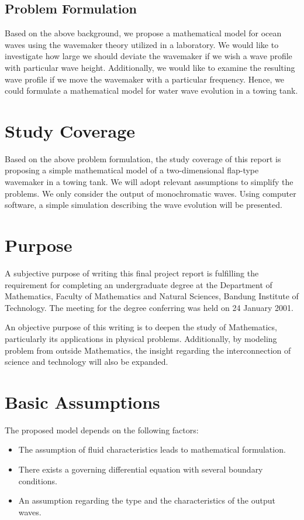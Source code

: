 \documentclass[12pt,a4paper]{report}
\begin{document}
\subsection{Problem Formulation}

Based on the above background, we propose a mathematical model for ocean waves using the wavemaker theory utilized in a laboratory.
We would like to investigate how large we should deviate the wavemaker if we wish a wave profile with particular wave height. 
Additionally, we would like to examine the resulting wave profile if we move the wavemaker with a particular frequency.
Hence, we could formulate a mathematical model for water wave evolution in a towing tank.

\section{Study Coverage}

Based on the above problem formulation, the study coverage of this report is proposing a simple mathematical model of a two-dimensional flap-type wavemaker in a towing tank.
We will adopt relevant assumptions to simplify the problems. We only consider the output of monochromatic waves. Using computer software, a simple simulation describing the wave evolution will be presented.

\section{Purpose}

A subjective purpose of writing this final project report is fulfilling the requirement for completing an undergraduate degree at the Department of Mathematics, Faculty of Mathematics and Natural Sciences, Bandung Institute of Technology. The meeting for the degree conferring was held on 24 January 2001.

An objective purpose of this writing is to deepen the study of Mathematics, particularly its applications in physical problems.
Additionally, by modeling problem from outside Mathematics, the insight regarding the interconnection of science and technology will also be expanded.

\section{Basic Assumptions}

The proposed model depends on the following factors:
\begin{itemize}[leftmargin=1.2em]
\item The assumption of fluid characteristics leads to mathematical formulation.
\item There exists a governing differential equation with several boundary conditions.
\item An assumption regarding the type and the characteristics of the output waves.
\end{itemize}
\end{document}

